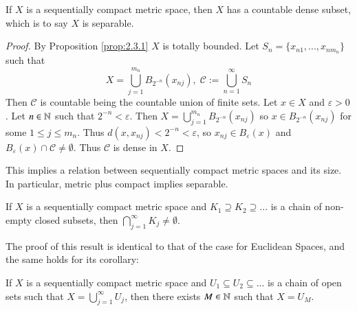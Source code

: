 \begin{cor}\label{cor:2.3.2}
    If $X$ is a sequentially compact metric space, then $X$ has a countable dense subset, which is to say $X$ is separable.
\end{cor}
\begin{proof}
    By Proposition \ref{prop:2.3.1} $X$ is totally bounded. Let $S_n = \{x_{n1},...,x_{nm_n}\}$ such that \begin{equation*}
        X = \bigcup_{j=1}^{m_n}B_{2^{-n}}(x_{nj}), \;\mathcal{C} := \bigcup_{n=1}^{\infty}S_n
    \end{equation*}
    Then $\mathcal{C}$ is countable being the countable union of finite sets. Let $x \in X$ and $\varepsilon > 0$. Let $n \in \mathbb N$ such that $2^{-n} < \varepsilon$. Then $X = \bigcup_{j=1}^{m_n}B_{2^{-n}}(x_{nj})$ so $x \in B_{2^{-n}}(x_{nj})$ for some $1 \leq j \leq m_n$. Thus $d(x,x_{nj}) < 2^{-n}<\varepsilon$, so $x_{nj} \in B_{\varepsilon}(x)$ and $B_{\varepsilon}(x)\cap \mathcal{C} \neq \emptyset$. Thus $\mathcal{C}$ is dense in $X$.
\end{proof}

This implies a relation between sequentially compact metric spaces and its size. In particular, metric plus compact implies separable.

\begin{prop}\label{prop:2.3.3}
    If $X$ is a sequentially compact metric space and $K_1 \supseteq K_2 \supseteq ...$ is a chain of non-empty closed subsets, then $\bigcap_{j=1}^{\infty}K_j \neq \emptyset$.
\end{prop}

The proof of this result is identical to that of the case for Euclidean Spaces, and the same holds for its corollary:

\begin{cor}\label{cor:2.3.4}
    If $X$ is a sequentially compact metric space and $U_1 \subseteq U_2 \subseteq ...$ is a chain of open sets such that $X = \bigcup_{j=1}^{\infty} U_j$, then there exists $M \in \mathbb N$ such that $X = U_M$.
\end{cor}


